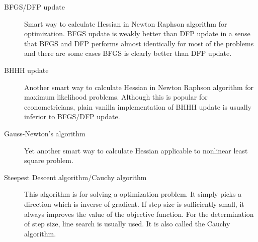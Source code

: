 \documentclass[12pt]{article}
\begin{document}
\begin{description}
	\item[BFGS/DFP update] Smart way to calculate Hessian in Newton Raphson algorithm for
      optimization. BFGS update is weakly better than DFP update in a sense that BFGS and DFP
      performs almost identically for most of the problems and there are some cases BFGS is
      clearly better than DFP update.  
	\item[BHHH update] Another smart way to calculate Hessian in Newton Raphson algorithm for
      maximum likelihood problems. Although this is popular for econometricians, plain vanilla
      implementation of BHHH update is usually inferior to BFGS/DFP update. 
	\item[Gauss-Newton's algorithm] Yet another smart way to calculate Hessian applicable to
      nonlinear least square problem.
	\item[Steepest Descent algorithm/Cauchy algorithm] This algorithm is for solving a
      optimization problem. It simply picks a direction which is inverse of gradient. If step size
      is sufficiently small, it always improves the value of the objective function. For the
      determination of step size, line search is usually used. It is also called the Cauchy
      algorithm. 
\end{description}



\end{document}
